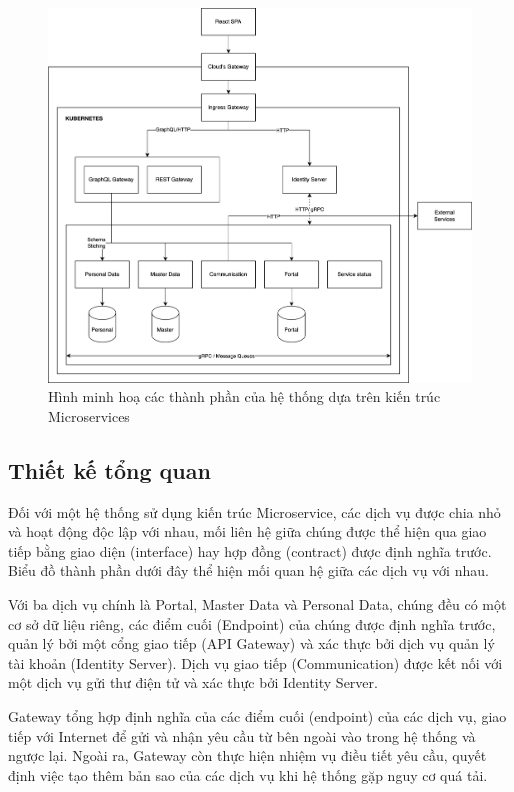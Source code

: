 \documentclass[../DoAn.tex]{subfiles}
\begin{document}
\begin{figure}[H]
    \centering
    \includegraphics[width=1.0\linewidth]{Hinhve/MicroserviceArchitecture.png}
    \caption{Hình minh hoạ các thành phần của hệ thống dựa trên kiến trúc Microservices}
    \label{fig:MicroserviceArchitecture}
\end{figure}
\newpage

\subsection{Thiết kế tổng quan}
\label{subsection:4.1.2}
Đối với một hệ thống sử dụng kiến trúc Microservice, các dịch vụ được chia nhỏ và hoạt động độc lập với nhau, mối liên hệ giữa chúng được thể hiện qua giao tiếp bằng giao diện (interface)
hay hợp đồng (contract) được định nghĩa trước. Biểu đồ thành phần dưới đây thể hiện mối quan hệ giữa các dịch vụ với nhau.

Với ba dịch vụ chính là Portal, Master Data và Personal Data,
chúng đều có một cơ sở dữ liệu riêng, các điểm cuối (Endpoint) của chúng được định nghĩa trước, quản lý bởi một cổng giao tiếp (API Gateway) và xác thực bởi dịch vụ quản lý tài khoản (Identity Server).
Dịch vụ giao tiếp (Communication) được kết nối với một dịch vụ gửi thư điện tử và xác thực bởi Identity Server.

Gateway tổng hợp định nghĩa của các điểm cuối (endpoint) của các dịch vụ, giao tiếp với Internet để gửi và nhận yêu cầu từ bên ngoài vào trong hệ thống và ngược lại. Ngoài ra,
Gateway còn thực hiện nhiệm vụ điều tiết yêu cầu, quyết định việc tạo thêm bản sao của các dịch vụ khi hệ thống gặp nguy cơ quá tải.
\end{document}
